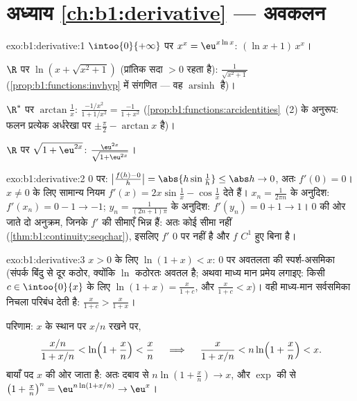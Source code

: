 \section*{अध्याय \ref{ch:b1:derivative} --- अवकलन}

\begin{solution}{exo:b1:derivative:1}
$\intoo{0}{+\infty}$ पर $x^x = \eu^{x\ln x}$:  $(\ln x + 1)\,x^x$।

$\R$ पर $\ln(x + \sqrt{x^2+1})$ (प्रांतिक सदा $> 0$ रहता है): 
$\frac{1}{\sqrt{x^2+1}}$ (\cref{prop:b1:functions:invhyp} में संगणित --- वह
$\operatorname{arsinh}$ है)।

$\R^*$ पर $\arctan\frac1x$:  $\frac{-1/x^2}{1 + 1/x^2} = \frac{-1}{1 +
x^2}$ (\cref{prop:b1:functions:arcidentities}~(2) के अनुरूप: फलन प्रत्येक
अर्धरेखा पर $\pm\frac\pi2 - \arctan x$ है)।

$\R$ पर $\sqrt{1 + \eu^{2x}}$:  $\frac{\eu^{2x}}{\sqrt{1 + \eu^{2x}}}$।
\end{solution}

\begin{solution}{exo:b1:derivative:2}
$0$ पर: $\bigl|\frac{f(h) - 0}{h}\bigr| = \abs{h \sin\frac1h} \leq \abs h
\to 0$, अतः $f'(0) = 0$। $x \neq 0$ के लिए सामान्य नियम $f'(x) =
2x\sin\frac1x - \cos\frac1x$ देते हैं। $x_n = \frac{1}{2\pi n}$ के अनुदिश:
$f'(x_n) = 0 - 1 \to -1$; $y_n = \frac{1}{(2n+1)\pi}$ के अनुदिश: $f'(y_n) =
0 + 1 \to 1$। $0$ की ओर जाते दो अनुक्रम, जिनके $f'$ की सीमाएँ भिन्न हैं: अतः
कोई सीमा नहीं (\cref{thm:b1:continuity:seqchar}), इसलिए $f'$ $0$ पर 
नहीं है और $f$ $C^1$ हुए बिना  है।
\end{solution}

\begin{solution}{exo:b1:derivative:3}
$x > 0$ के लिए $\ln(1+x) < x$: $0$ पर अवतलता की स्पर्श-असमिका (संपर्क बिंदु
से दूर कठोर, क्योंकि $\ln$ कठोरतः अवतल है; अथवा माध्य मान प्रमेय लगाइए: किसी
$c \in \intoo{0}{x}$ के लिए $\ln(1+x) = \frac{x}{1+c}$, और $\frac{x}{1+c} <
x$)। वही माध्य-मान सर्वसमिका निचला परिबंध देती है: $\frac{x}{1+c} >
\frac{x}{1+x}$।

परिणाम: $x$ के स्थान पर $x/n$ रखने पर,
\[
\frac{x/n}{1 + x/n} < \ln\Bigl(1 + \frac xn\Bigr) < \frac xn
\quad\implies\quad
\frac{x}{1 + x/n} < n \ln\Bigl(1 + \frac xn\Bigr) < x .
\]
बायाँ पद $x$ की ओर जाता है: अतः दबाव से $n\ln(1 + \frac xn) \to x$, और
$\exp$ की  से $\bigl(1 + \frac xn\bigr)^n = \eu^{n\ln(1 + x/n)} \to
\eu^x$।
\end{solution}

